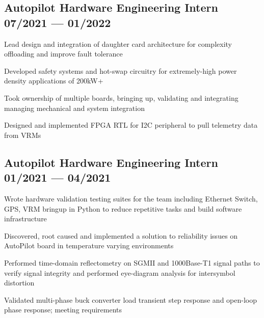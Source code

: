 \documentclass[letter,10pt]{article}
\begin{document}

\subsection{{Autopilot Hardware Engineering Intern \hfill 07/2021 --- 01/2022}}
\begin{zitemize}
\item Lead design and integration of daughter card architecture for complexity offloading and improve fault tolerance
\item Developed safety systems and hot-swap circuitry for extremely-high power density applications of 200kW+
\item Took ownership of multiple boards, bringing up, validating and integrating managing mechanical and system integration
\item Designed and implemented FPGA RTL for I2C peripheral to pull telemetry data from VRMs
\end{zitemize}
{\color{sectiondivide} \vspace{-0.75em}\hrulefill}

\subsection{{Autopilot Hardware Engineering Intern \hfill 01/2021 --- 04/2021}}
\begin{zitemize}
\item Wrote hardware validation testing suites for the team including Ethernet Switch, GPS, VRM bringup in Python to reduce repetitive tasks and build software infrastructure
\item Discovered, root caused and implemented a solution to reliability issues on AutoPilot board in temperature varying environments
\item Performed time-domain reflectometry on SGMII and 1000Base-T1 signal paths to verify signal integrity and performed eye-diagram analysis for intersymbol distortion
\item Validated multi-phase buck converter load transient step response and open-loop phase response; meeting requirements
\end{zitemize}
{\color{sectiondivide} \vspace{-0.75em}\hrulefill}
\end{document}
